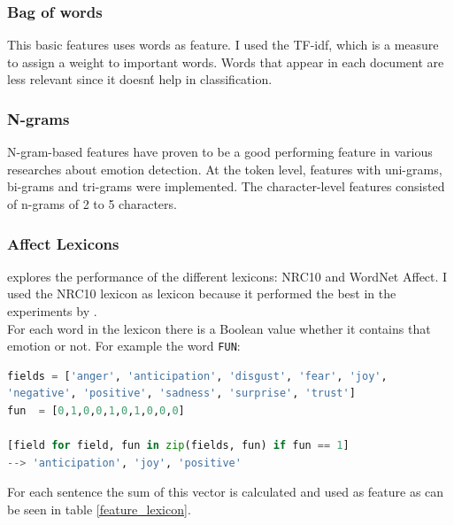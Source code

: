 \documentclass[
10pt, %
a4paper, %
oneside, %
headinclude,footinclude, %
BCOR5mm, %
]{scrartcl}
\begin{document}
\subsubsection{Bag of words}
This basic features uses words as feature. I used the TF-idf, which is a measure to assign a weight to important words. Words that appear in each document are less relevant since it doesn\'t help in classification.

\subsubsection{N-grams}
N-gram-based features have proven to be a good performing feature in various researches about emotion detection. At the token level, features with uni-grams, bi-grams and tri-grams were implemented. The character-level features consisted of n-grams of 2 to 5 characters. 

\subsubsection{Affect Lexicons}
\citeauthor{mohammad:2012:NAACL-HLT} explores the performance of the different lexicons: NRC10 \citep{Mohammad13} and WordNet Affect\citep{strapparava2004wordnet}. I used the NRC10 lexicon as lexicon because it performed the best in the experiments by \citep{mohammad:2012:NAACL-HLT}. \\
For each word in the lexicon there is a Boolean value whether it contains that emotion or not. For example the word \texttt{FUN}:
\begin{lstlisting}[language=python]
fields = ['anger', 'anticipation', 'disgust', 'fear', 'joy',
'negative', 'positive', 'sadness', 'surprise', 'trust']
fun  = [0,1,0,0,1,0,1,0,0,0]

[field for field, fun in zip(fields, fun) if fun == 1]
--> 'anticipation', 'joy', 'positive'
\end{lstlisting}
For each sentence the sum of this vector is calculated and used as feature as can be seen in table \ref{feature_lexicon}.
\end{document}
